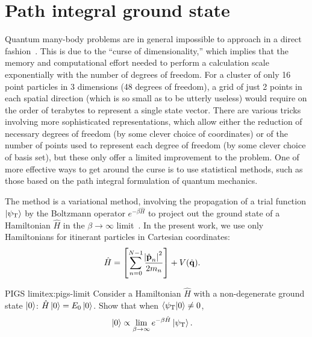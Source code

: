 \section{Path integral ground state}

Quantum many-body problems are in general impossible to approach in a direct fashion~\cite[391-392]{tuckerman2010statistical}.
This is due to the ``curse of dimensionality,'' which implies that the memory and computational effort needed to perform a calculation scale exponentially with the number of degrees of freedom.
For a cluster of only 16 point particles in 3 dimensions (48 degrees of freedom), a grid of just 2 points in each spatial direction (which is so small as to be utterly useless) would require on the order of terabytes to represent a single state vector.
There are various tricks involving more sophisticated representations, which allow either the reduction of necessary degrees of freedom (by some clever choice of coordinates) or of the number of points used to represent each degree of freedom (by some clever choice of basis set), but these only offer a limited improvement to the problem.
One of more effective ways to get around the curse is to use statistical methods, such as those based on the path integral formulation of quantum mechanics.

The  method is a variational method, involving the propagation of a trial function $\ket{\psi_\mathrm{T}}$ by the Boltzmann operator $e^{-\beta \hat{H}}$ to project out the ground state of a Hamiltonian $\hat{H}$ in the $\beta \to \infty$ limit~\cite{sarsa2000pigs}.
In the present work, we use only Hamiltonians for itinerant particles in Cartesian coordinates:
\begin{align}
	\hat{H}
	&= \left[ \sum_{n=0}^{N-1} \frac{\abs{\hat{\bm{\mathbf{p}}}_n}^2}{2 m_n} \right]
		+ V(\hat{\bm{\mathbf{q}}}).
\end{align}

\begin{DefExercise}{PIGS limit}{ex:pigs-limit}
	Consider a Hamiltonian $\hat{H}$ with a non-degenerate ground state $\ket{0}$: $\hat{H} \ket{0} = E_0 \ket{0}$.
	Show that when $\braket{\psi_\mathrm{T} | 0} \ne 0$,
	\begin{align}
		\ket{0}
		&\propto \lim_{\beta \to \infty} e^{-\beta \hat{H}} \ket{\psi_\mathrm{T}}.
	\end{align}
\end{DefExercise}

